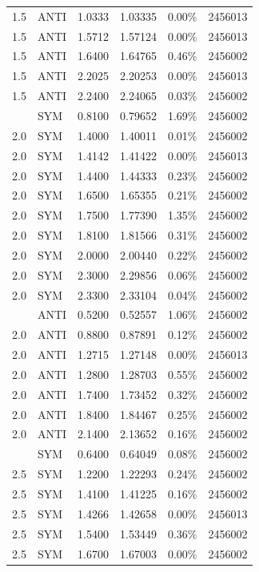 \begin{center}
\begin{longtable}{@{}rllrrr@{}}
1.5 & ANTI & 1.0333 & 1.03335 & 0.00\% & 2456013 \\
1.5 & ANTI & 1.5712 & 1.57124 & 0.00\% & 2456013 \\
1.5 & ANTI & 1.6400 & 1.64765 & 0.46\% & 2456002 \\
1.5 & ANTI & 2.2025 & 2.20253 & 0.00\% & 2456013 \\
1.5 & ANTI & 2.2400 & 2.24065 & 0.03\% & 2456002 \\
\addlinespace
2.0 & SYM & 0.8100 & 0.79652 & 1.69\% & 2456002 \\
2.0 & SYM & 1.4000 & 1.40011 & 0.01\% & 2456002 \\
2.0 & SYM & 1.4142 & 1.41422 & 0.00\% & 2456013 \\
2.0 & SYM & 1.4400 & 1.44333 & 0.23\% & 2456002 \\
2.0 & SYM & 1.6500 & 1.65355 & 0.21\% & 2456002 \\
2.0 & SYM & 1.7500 & 1.77390 & 1.35\% & 2456002 \\
2.0 & SYM & 1.8100 & 1.81566 & 0.31\% & 2456002 \\
2.0 & SYM & 2.0000 & 2.00440 & 0.22\% & 2456002 \\
2.0 & SYM & 2.3000 & 2.29856 & 0.06\% & 2456002 \\
2.0 & SYM & 2.3300 & 2.33104 & 0.04\% & 2456002 \\
\addlinespace
2.0 & ANTI & 0.5200 & 0.52557 & 1.06\% & 2456002 \\
2.0 & ANTI & 0.8800 & 0.87891 & 0.12\% & 2456002 \\
2.0 & ANTI & 1.2715 & 1.27148 & 0.00\% & 2456013 \\
2.0 & ANTI & 1.2800 & 1.28703 & 0.55\% & 2456002 \\
2.0 & ANTI & 1.7400 & 1.73452 & 0.32\% & 2456002 \\
2.0 & ANTI & 1.8400 & 1.84467 & 0.25\% & 2456002 \\
2.0 & ANTI & 2.1400 & 2.13652 & 0.16\% & 2456002 \\
\addlinespace
2.5 & SYM & 0.6400 & 0.64049 & 0.08\% & 2456002 \\
2.5 & SYM & 1.2200 & 1.22293 & 0.24\% & 2456002 \\
2.5 & SYM & 1.4100 & 1.41225 & 0.16\% & 2456002 \\
2.5 & SYM & 1.4266 & 1.42658 & 0.00\% & 2456013 \\
2.5 & SYM & 1.5400 & 1.53449 & 0.36\% & 2456002 \\
2.5 & SYM & 1.6700 & 1.67003 & 0.00\% & 2456002 \\

\end{longtable}
\end{center}
